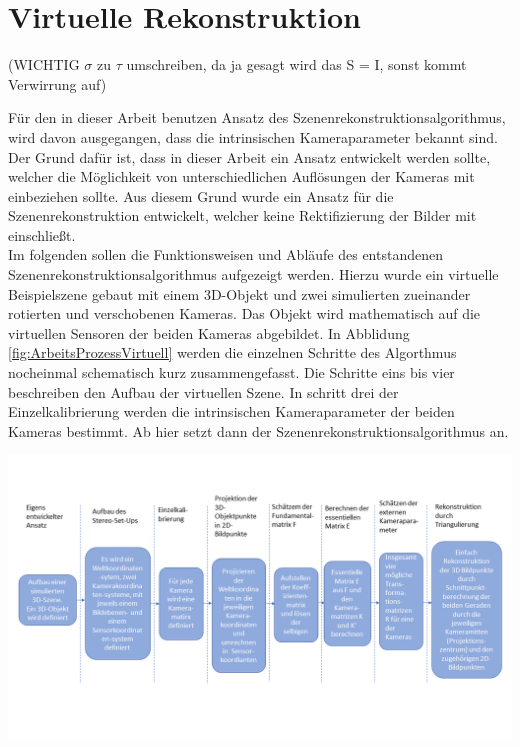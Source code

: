 \chapter{Virtuelle Rekonstruktion}
\label{sec:minimal} 


(WICHTIG $\sigma$ zu $\tau$ umschreiben, da ja gesagt wird das S = I, sonst kommt Verwirrung auf)


Für den in dieser Arbeit benutzen Ansatz des Szenenrekonstruktionsalgorithmus, wird davon ausgegangen, dass die intrinsischen Kameraparameter bekannt sind. Der Grund dafür ist, dass in dieser Arbeit ein Ansatz entwickelt werden sollte, welcher die Möglichkeit von unterschiedlichen Auflösungen der Kameras mit einbeziehen sollte. Aus diesem Grund wurde ein Ansatz für die Szenenrekonstruktion entwickelt, welcher keine Rektifizierung der Bilder mit einschließt. \\

Im folgenden sollen die Funktionsweisen und Abläufe des entstandenen Szenenrekonstruktionsalgorithmus aufgezeigt werden. Hierzu wurde ein virtuelle Beispielszene gebaut mit einem 3D-Objekt und zwei simulierten zueinander rotierten und verschobenen Kameras. Das Objekt wird mathematisch auf die virtuellen Sensoren der beiden Kameras abgebildet. In Abblidung \ref{fig:ArbeitsProzessVirtuell} werden die einzelnen Schritte des Algorthmus nocheinmal schematisch kurz zusammengefasst. Die Schritte eins bis vier beschreiben den Aufbau der virtuellen Szene. In schritt drei der Einzelkalibrierung werden die intrinsischen Kameraparameter der beiden Kameras bestimmt. Ab hier setzt dann der Szenenrekonstruktionsalgorithmus an.

\begin{minipage}{\linewidth}
	\centering
	\includegraphics[width=1.\linewidth]{images/ArbeitsProzessMinimal.png}
	\label{fig:ArbeitsProzessVirtuell}
\end{minipage}\\ \\

